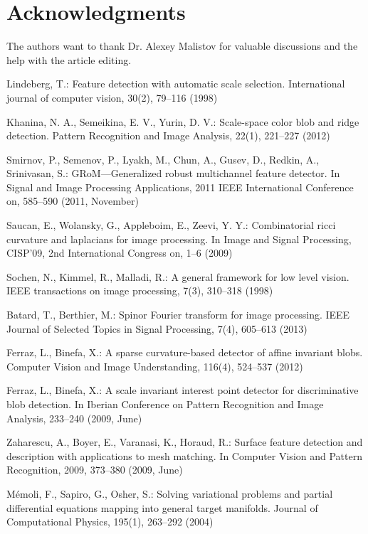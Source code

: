 \documentclass{llncs}
\begin{document}
\section*{Acknowledgments}
The authors want to thank Dr. Alexey Malistov for valuable discussions and the help with the article editing.

\begin{thebibliography}{16}
%
Lindeberg, T.:
Feature detection with automatic scale selection. 
International journal of computer vision, 30(2), 79--116 (1998)

Khanina, N. A., Semeikina, E. V., Yurin, D. V.:
Scale-space color blob and ridge detection. 
Pattern Recognition and Image Analysis, 22(1), 221--227 (2012)

Smirnov, P., Semenov, P., Lyakh, M., Chun, A., Gusev, D., Redkin, A., Srinivasan, S.:
GRoM—Generalized robust multichannel feature detector. 
In Signal and Image Processing Applications, 2011 IEEE International Conference on, 585--590 (2011, November)

Saucan, E., Wolansky, G., Appleboim, E., Zeevi, Y. Y.:
Combinatorial ricci curvature and laplacians for image processing. 
In Image and Signal Processing, CISP'09, 2nd International Congress on, 1--6 (2009)

Sochen, N., Kimmel, R., Malladi, R.: 
A general framework for low level vision. 
IEEE transactions on image processing, 7(3), 310--318 (1998)

Batard, T., Berthier, M.:
Spinor Fourier transform for image processing. 
IEEE Journal of Selected Topics in Signal Processing, 7(4), 605--613 (2013)

Ferraz, L., Binefa, X.:
A sparse curvature-based detector of affine invariant blobs. 
Computer Vision and Image Understanding, 116(4), 524--537 (2012)

Ferraz, L., Binefa, X.:
A scale invariant interest point detector for discriminative blob detection. 
In Iberian Conference on Pattern Recognition and Image Analysis, 233--240  (2009, June)

Zaharescu, A., Boyer, E., Varanasi, K., Horaud, R.:
Surface feature detection and description with applications to mesh matching. 
In Computer Vision and Pattern Recognition, 2009, 373--380 (2009, June)

Mémoli, F., Sapiro, G., Osher, S.:
Solving variational problems and partial differential equations mapping into general target manifolds. 
Journal of Computational Physics, 195(1), 263--292 (2004)


\end{thebibliography}
\end{document}

